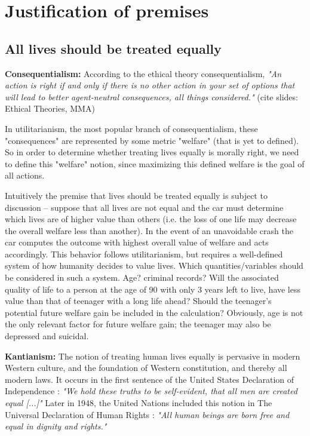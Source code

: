 \section{Justification of premises}


\subsection{All lives should be treated equally}
\textbf{Consequentialism:} According to the ethical theory consequentialism, \textit{"An action is right if and only if there is no other action in your set of options that will lead to better agent-neutral consequences, all things considered."} (cite slides: Ethical Theories, MMA)

In utilitarianism, the most popular branch of consequentialism, these "consequences" are represented by some metric "welfare" (that is yet to defined). So in order to determine whether treating lives equally is morally right, we need to define this "welfare" notion, since  maximizing this defined welfare is the goal of all actions.

Intuitively the premise that lives should be treated equally is subject to discussion --
suppose that all lives are not equal and the car must determine which lives
are of higher value than others (i.e. the loss of one life may decrease the overall welfare less than another).
In the event of an unavoidable crash the car computes the outcome with highest overall value of welfare and acts accordingly.
This behavior follows utilitarianism, but requires a well-defined system of
how humanity decides to value lives. Which quantities/variables should be
considered in such a system. Age? criminal records?
Will the associated quality of life to a person at the age of 90 with only 3 years left to live,
have less value than that of teenager with a long life ahead? Should the teenager's potential future welfare gain be included in the calculation?
Obviously, age is not the only relevant factor for future welfare gain;  the teenager may also be depressed and suicidal.

\textbf{Kantianism:} The notion of treating human lives equally is pervasive in modern Western culture, and the foundation of Western constitution, and thereby all modern laws. It occurs in the first sentence of the United States Declaration of Independence \cite{Declaration}: \textit{"We hold these truths to be self-evident, that all men are created equal [...]"} Later in 1948, the United Nations included this notion in The Universal Declaration of Human Rights \cite{UN}: \textit{"All human beings are born free and equal in dignity and rights."}

